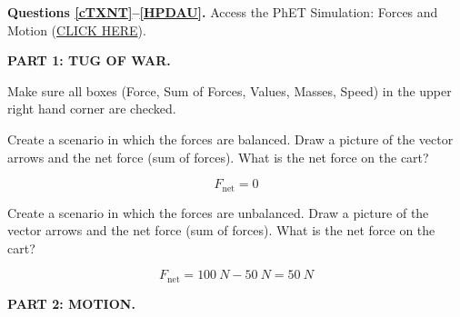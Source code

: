 \documentclass[]{exam}
\begin{document}
\textbf{Questions \ref{cTXNT}--\ref{HPDAU}.} Access the PhET Simulation: Forces and Motion (\href{https://phet.colorado.edu/sims/html/forces-and-motion-basics/latest/forces-and-motion-basics_all.html}{CLICK HERE}).

\textbf{PART 1: TUG OF WAR.} 



Make sure all boxes (Force, Sum of Forces, Values, Masses, Speed) in the upper right hand corner are checked.

\begin{questions}

\question \label{cTXNT}
Create a scenario in which the forces are balanced. Draw a picture of the vector arrows and the net force (sum of forces). What is the net force on the cart? 

\begin{solution}
\begin{center}

\begin{equation*}
    F_\mathrm{net} = 0
\end{equation*}
\end{center}
\end{solution}

\question
Create a scenario in which the forces are unbalanced. Draw a picture of the vector arrows and the net force (sum of forces). What is the net force on the cart?

\begin{solution}
\begin{center}

\begin{equation*}
    F_\mathrm{net} = \SI{100}{N} - \SI{50}{N} = \SI{50}{N}
\end{equation*}

\end{center}
\end{solution}


\begin{EnvUplevel}
    \textbf{PART 2: MOTION.} 
    

\end{EnvUplevel}
\end{questions}
\end{document}
